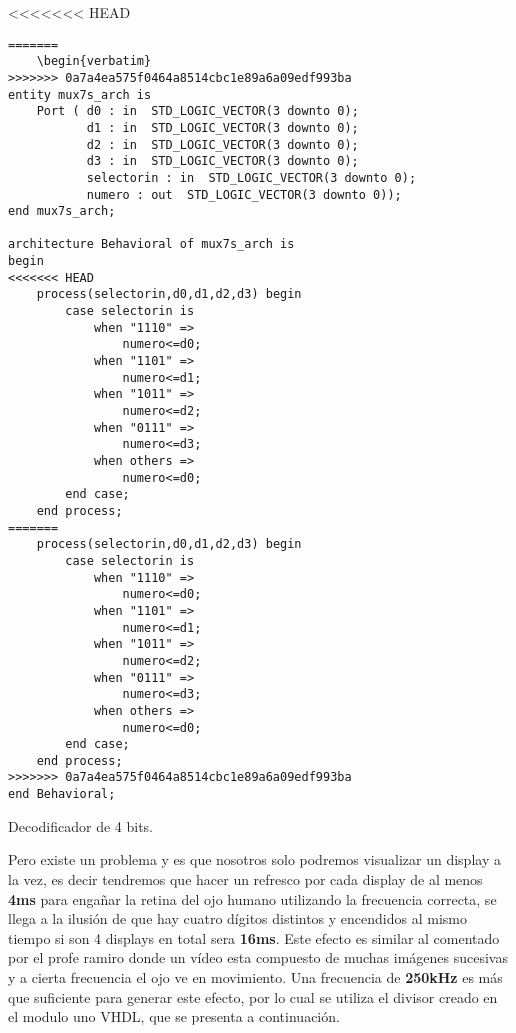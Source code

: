 \documentclass[paper=a4, fontsize=12pt]{article}        %
\numberwithin{equation}{section}                        %
\numberwithin{table}{section}                           %
\numberwithin{equation}{section}						%
\numberwithin{table}{section} 							%
\begin{document}
\begin{listing}[H]
<<<<<<< HEAD
    \begin{verbatim}
=======
	\begin{verbatim}
>>>>>>> 0a7a4ea575f0464a8514cbc1e89a6a09edf993ba
entity mux7s_arch is
    Port ( d0 : in  STD_LOGIC_VECTOR(3 downto 0);
           d1 : in  STD_LOGIC_VECTOR(3 downto 0);
           d2 : in  STD_LOGIC_VECTOR(3 downto 0);
           d3 : in  STD_LOGIC_VECTOR(3 downto 0);
           selectorin : in  STD_LOGIC_VECTOR(3 downto 0);
           numero : out  STD_LOGIC_VECTOR(3 downto 0));
end mux7s_arch;

architecture Behavioral of mux7s_arch is
begin
<<<<<<< HEAD
    process(selectorin,d0,d1,d2,d3) begin
        case selectorin is
            when "1110" =>
                numero<=d0;
            when "1101" =>
                numero<=d1;
            when "1011" =>
                numero<=d2;
            when "0111" =>
                numero<=d3;
            when others =>
                numero<=d0;
        end case;
    end process;
=======
	process(selectorin,d0,d1,d2,d3) begin
		case selectorin is
			when "1110" =>
				numero<=d0;
			when "1101" =>
				numero<=d1;
			when "1011" =>
				numero<=d2;
			when "0111" =>
				numero<=d3;
			when others =>
				numero<=d0;
		end case;
	end process;
>>>>>>> 0a7a4ea575f0464a8514cbc1e89a6a09edf993ba
end Behavioral;
\end{verbatim}
\caption{Decodificador de 4 bits.}
    \label{mux2}
\end{listing}

Pero existe un problema y es que nosotros solo podremos visualizar un display a la vez, es decir tendremos que hacer un refresco por cada display de al menos \textbf{4ms} para engañar la retina del ojo humano utilizando la frecuencia correcta, se llega a la ilusión de que hay cuatro dígitos distintos y encendidos al mismo tiempo si son 4 displays en total sera \textbf{16ms}. Este efecto es similar al comentado por el profe ramiro donde un vídeo esta compuesto de muchas imágenes sucesivas y a cierta frecuencia el ojo ve en movimiento. Una frecuencia de \textbf{250kHz} es más que suficiente para generar este efecto, por lo cual se utiliza el divisor creado en el modulo uno VHDL, que se presenta a continuación. 
\end{document}
